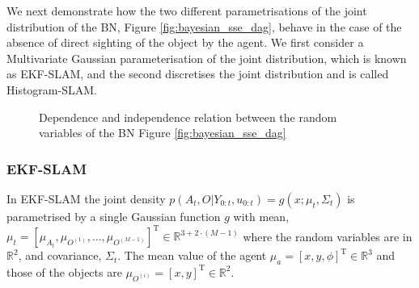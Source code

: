 
We next demonstrate how the two different parametrisations of the joint distribution of the BN, Figure \ref{fig:bayesian_sse_dag}, 
behave in the case of the absence of direct sighting of the object by the agent. We first consider a
Multivariate Gaussian parameterisation of the joint distribution, which is known as EKF-SLAM, and the second discretises the joint distribution and is called Histogram-SLAM.


\begin{figure}
\centering
{}%
\caption{Dependence and independence relation between the random variables of the BN Figure \ref{fig:bayesian_sse_dag}}
 \label{fig:ch5_dseperation}
\end{figure}

\subsubsection{EKF-SLAM}\label{sec:EKF-SLAM}

In EKF-SLAM the joint density $p(A_{t},O|Y_{0:t},u_{0:t}) = g(x;\mu_t,\Sigma_t)$ is parametrised by a single Gaussian function $g$ with mean,
$\mu_t = \left[\mu_{A_{t}},\mu_{O^{(1)}},\dots,\mu_{O^{(M-1)}}\right]^{\mathrm{T}} \in \mathbb{R}^{3 + 2\cdot (M-1)}$  where the 
random variables are in $\mathbb{R}^2$, and covariance, $\Sigma_t$. The mean value of
the agent $\mu_a = [x,y,\phi]^{\mathrm{T}} \in \mathbb{R}^3$ and those of the objects are $\mu_{O^{(i)}} = [x,y]^{\mathrm{T}} \in \mathbb{R}^2$.

